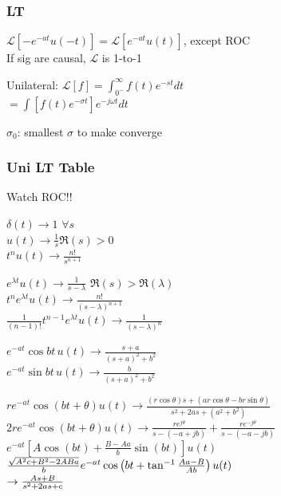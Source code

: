 \documentclass[4pt]{article}
\theoremstyle{definition}
\theoremstyle{definition}
\renewcommand{\o}{\omega}
\newcommand{\ra}{\rightarrow}
\newcommand{\ulint}{\int_{0^-}^{\infty}}    %
\begin{document}
\begin{landscape}
\begin{multicols}{3}
\subsubsection*{LT}
\(\mathcal L [-e^{-at}u(-t)] = \mathcal L [e^{-at} u(t)]\), except ROC\\
If sig are causal, $\mathcal L$ is 1-to-1           %

Unilateral: \(\mathcal{L}[f] = \ulint f(t) e^{-st} dt\)\\          %
\(= \int [f(t) e^{-\sigma t}] e^{-j\o t} dt\)


$\sigma_0$: smallest $\sigma$ to make converge
\subsubsection*{Uni LT Table}
    Watch ROC!!     %

    $\delta(t) \ra 1$ \hfill $\forall s$\\
    $u(t) \ra \frac{1}{s}$\hfill $\Re(s) > 0$\\
    $t^n u(t) \ra \frac{n!}{s^{n+1}}$               %

    \(e^{\lambda t} u(t) \ra \frac{1}{s-\lambda}\) \hfill $\Re(s) > \Re(\lambda)$\\        %
    \(t^n e^{\lambda t} u(t) \ra \frac{n!}{(s-\lambda)^{n+1}}\)\\     %
    \(\frac{1}{(n-1)!} t^{n-1} e^{\lambda t} u(t) \ra \frac{1}{(s-\lambda)^n} \)        %

    \(e^{-at} \cos bt\, u(t) \ra \frac{s+a}{(s+a)^2 + b^2}\)\\
    \(e^{-at} \sin bt\, u(t) \ra \frac{b}{(s+a)^2 + b^2}\)    

    \(re^{-at} \cos(bt + \theta) u(t) \ra \frac{(r\cos\theta)s + (ar \cos\theta - br\sin \theta)}{s^2 + 2as + (a^2 + b^2)}\)\\
    \(2re^{-at} \cos(bt + \theta) u(t) \ra \frac{re^{j\theta}}{s-(-a+jb)}+\frac{re^{-j\theta}}{s-(-a-jb)}\)\\
    \(e^{-at}\left[A\cos(b t) + \frac{B-Aa}{b}\sin(bt)\right] u(t)\)\\
    \(\hfill \frac{\sqrt{A^2c + B^2 - 2ABa}}{b}e^{-at}\cos\left(bt + \tan^{-1}\frac{Aa-B}{Ab}\right) u(t)\)\\
    \(\hfill \ra \frac{As+B}{s^2+2as+c}\)
\columnbreak

\end{multicols}
\end{landscape}
\end{document}
